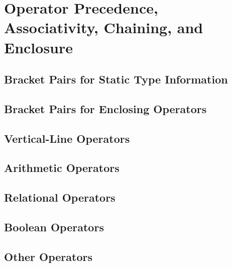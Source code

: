%
%
%
%

\chapter{Operator Precedence, Associativity, Chaining, and Enclosure}

\section{Bracket Pairs for Static Type Information}
\section{Bracket Pairs for Enclosing Operators}
\section{Vertical-Line Operators}
\section{Arithmetic Operators}
\section{Relational Operators}
\section{Boolean Operators}
\section{Other Operators}

